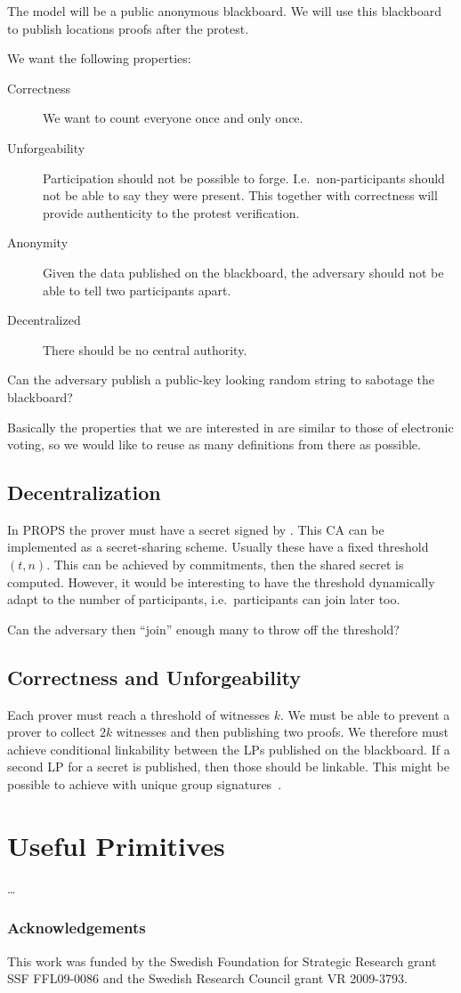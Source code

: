 The model will be a public anonymous blackboard.
We will use this blackboard to publish locations proofs after the protest.

We want the following properties:
\begin{description}
  \item[Correctness] We want to count everyone once and only once.
  \item[Unforgeability] Participation should not be possible to forge.
    I.e.\ non-participants should not be able to say they were present.
    This together with correctness will provide authenticity to the protest 
    verification.
  \item[Anonymity] Given the data published on the blackboard, the adversary 
    should not be able to tell two participants apart.
  \item[Decentralized] There should be no central authority.
\end{description}

Can the adversary publish a public-key looking random string to sabotage the 
blackboard?

Basically the properties that we are interested in are similar to those of 
electronic voting, so we would like to reuse as many definitions from there as 
possible.

\subsection{Decentralization}

In \ac{PROPS} the prover must have a secret signed by .
This \ac{CA} can be implemented as a secret-sharing scheme.
Usually these have a fixed threshold \((t, n)\).
This can be achieved by commitments, then the shared secret is computed.
However, it would be interesting to have the threshold dynamically adapt to the 
number of participants, i.e.\ participants can join later too.

Can the adversary then \enquote{join} enough many to throw off the threshold?

\subsection{Correctness and Unforgeability}

Each prover must reach a threshold of witnesses \(k\).
We must be able to prevent a prover to collect \(2k\) witnesses and then 
publishing two proofs.
We therefore must achieve conditional linkability between the \acp{LP} 
published on the blackboard.
If a second \ac{LP} for a secret is published, then those should be linkable.
This might be possible to achieve with unique group 
signatures~\cite{UniqueGroupSignatures,UniqueRingSignatures,ListSignatures}.


\section{Useful Primitives}
\label{UsefulPrimitives}

\dots


\subsubsection*{Acknowledgements}

This work was funded by the Swedish Foundation for Strategic Research grant SSF 
FFL09-0086 and the Swedish Research Council grant VR 2009-3793.


\printbibliography{}

